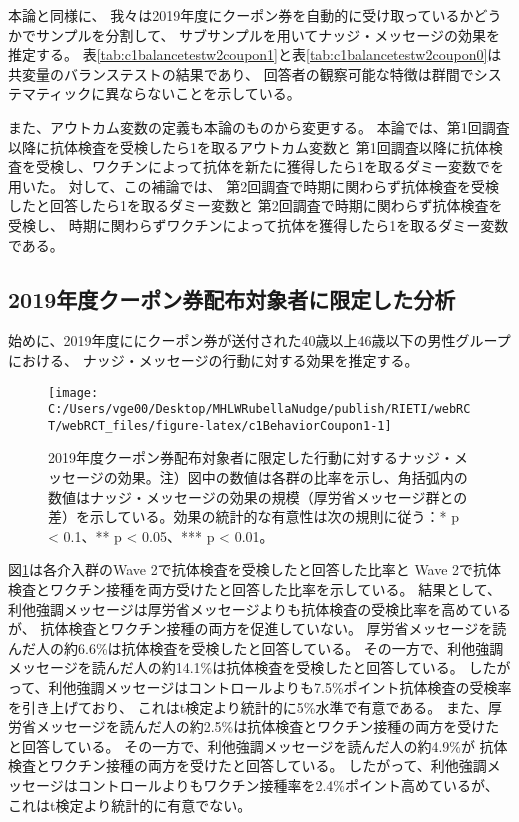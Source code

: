 \documentclass[
  11pt,
  a4paper,
]{article}
\begin{document}
本論と同様に、
我々は2019年度にクーポン券を自動的に受け取っているかどうかでサンプルを分割して、
サブサンプルを用いてナッジ・メッセージの効果を推定する。
表\ref{tab:c1balancetestw2coupon1}と表\ref{tab:c1balancetestw2coupon0}は共変量のバランステストの結果であり、
回答者の観察可能な特徴は群間でシステマティックに異ならないことを示している。

また、アウトカム変数の定義も本論のものから変更する。
本論では、第1回調査以降に抗体検査を受検したら1を取るアウトカム変数と
第1回調査以降に抗体検査を受検し、ワクチンによって抗体を新たに獲得したら1を取るダミー変数でを用いた。
対して、この補論では、
第2回調査で時期に関わらず抗体検査を受検したと回答したら1を取るダミー変数と
第2回調査で時期に関わらず抗体検査を受検し、
時期に関わらずワクチンによって抗体を獲得したら1を取るダミー変数である。

\hypertarget{ux5e74ux5ea6ux30afux30fcux30ddux30f3ux5238ux914dux5e03ux5bfeux8c61ux8005ux306bux9650ux5b9aux3057ux305fux5206ux6790}{%
\subsection{2019年度クーポン券配布対象者に限定した分析}\label{ux5e74ux5ea6ux30afux30fcux30ddux30f3ux5238ux914dux5e03ux5bfeux8c61ux8005ux306bux9650ux5b9aux3057ux305fux5206ux6790}}

始めに、2019年度ににクーポン券が送付された40歳以上46歳以下の男性グループにおける、
ナッジ・メッセージの行動に対する効果を推定する。

\begin{figure}[t]
\texttt{[image: C:/Users/vge00/Desktop/MHLWRubellaNudge/publish/RIETI/webRCT/webRCT\_files/figure-latex/c1BehaviorCoupon1-1]} \caption{2019年度クーポン券配布対象者に限定した行動に対するナッジ・メッセージの効果。注）図中の数値は各群の比率を示し、角括弧内の数値はナッジ・メッセージの効果の規模（厚労省メッセージ群との差）を示している。効果の統計的な有意性は次の規則に従う：* p < 0.1、** p < 0.05、*** p < 0.01。}\label{fig:c1BehaviorCoupon1}
\end{figure}

図\ref{fig:c1BehaviorCoupon1}は各介入群のWave 2で抗体検査を受検したと回答した比率と
Wave 2で抗体検査とワクチン接種を両方受けたと回答した比率を示している。
結果として、利他強調メッセージは厚労省メッセージよりも抗体検査の受検比率を高めているが、
抗体検査とワクチン接種の両方を促進していない。
厚労省メッセージを読んだ人の約6.6\%は抗体検査を受検したと回答している。
その一方で、利他強調メッセージを読んだ人の約14.1\%は抗体検査を受検したと回答している。
したがって、利他強調メッセージはコントロールよりも7.5\%ポイント抗体検査の受検率を引き上げており、
これはt検定より統計的に5\%水準で有意である。
また、厚労省メッセージを読んだ人の約2.5\%は抗体検査とワクチン接種の両方を受けたと回答している。
その一方で、利他強調メッセージを読んだ人の約4.9\%が
抗体検査とワクチン接種の両方を受けたと回答している。
したがって、利他強調メッセージはコントロールよりもワクチン接種率を2.4\%ポイント高めているが、
これはt検定より統計的に有意でない。
\end{document}
